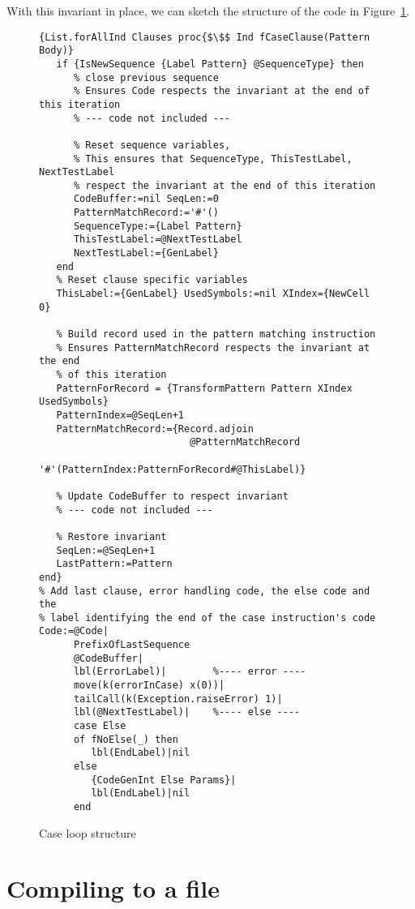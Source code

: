 \documentclass[a4paper]{memoir}
\begin{document}
With this invariant in place, we can sketch the structure of the code 
in Figure~\ref{fig:caseloop}.
\begin{figure}[H]
\begin{lstlisting}[mathescape]
{List.forAllInd Clauses proc{$\$$ Ind fCaseClause(Pattern Body)}
   if {IsNewSequence {Label Pattern} @SequenceType} then
      % close previous sequence
      % Ensures Code respects the invariant at the end of this iteration
      % --- code not included ---

      % Reset sequence variables, 
      % This ensures that SequenceType, ThisTestLabel, NextTestLabel 
      % respect the invariant at the end of this iteration
      CodeBuffer:=nil SeqLen:=0
      PatternMatchRecord:='#'()
      SequenceType:={Label Pattern}
      ThisTestLabel:=@NextTestLabel
      NextTestLabel:={GenLabel}
   end
   % Reset clause specific variables 
   ThisLabel:={GenLabel} UsedSymbols:=nil XIndex={NewCell 0}

   % Build record used in the pattern matching instruction
   % Ensures PatternMatchRecord respects the invariant at the end 
   % of this iteration
   PatternForRecord = {TransformPattern Pattern XIndex UsedSymbols}
   PatternIndex=@SeqLen+1
   PatternMatchRecord:={Record.adjoin 
                          @PatternMatchRecord 
                          '#'(PatternIndex:PatternForRecord#@ThisLabel)}

   % Update CodeBuffer to respect invariant
   % --- code not included ---

   % Restore invariant
   SeqLen:=@SeqLen+1
   LastPattern:=Pattern
end}
% Add last clause, error handling code, the else code and the 
% label identifying the end of the case instruction's code
Code:=@Code|
      PrefixOfLastSequence
      @CodeBuffer|
      lbl(ErrorLabel)|        %---- error ----
      move(k(errorInCase) x(0))|
      tailCall(k(Exception.raiseError) 1)|
      lbl(@NextTestLabel)|    %---- else ----
      case Else
      of fNoElse(_) then
         lbl(EndLabel)|nil
      else
         {CodeGenInt Else Params}|
         lbl(EndLabel)|nil
      end
\end{lstlisting}
\caption{Case loop structure}
\label{fig:caseloop}
\end{figure}




\section{Compiling to a file}
\end{document}
